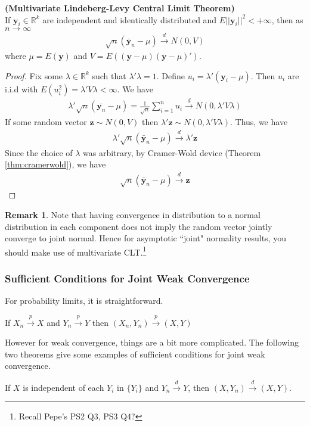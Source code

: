 \documentclass[11pt]{article} %
\theoremstyle{definition}
\numberwithin{defn}{subsection}
\numberwithin{thm}{subsection}
\newtheorem*{rmk}{Remark}
\numberwithin{ex}{subsection}
\newcommand{\bb}[1]{\mathbb{#1}}
\newcommand{\R}{\bb{R}}
\newcommand{\plim}{\overset{p}{\rightarrow}}
\newcommand{\dlim}{\overset{d}{\rightarrow}}
\newcommand{\sumi}{\sum_{i=1}^n}
\newcommand{\ninfty}{n\rightarrow\infty}
\begin{document}

\begin{thm}\label{thm:clt(vector)}
	\textbf{(Multivariate Lindeberg-Levy Central Limit Theorem)}	\\
	If $\bm{y}_i\in\R^k$ are independent and identically distributed and $E||\bm{y}_i||^2<+\infty$, then as $\ninfty$
	\begin{align*}
	\sqrt{n}(\bar{\bm{y}}_n-\mu)\dlim N(0,V)
	\end{align*}
	where $\mu=E(\bm{y})$ and $V=E((\bm{y}-\mu)(\bm{y}-\mu)')$.
	\begin{proof}
		Fix some $\lambda\in \R^k$ such that $\lambda'\lambda=1$. Define $u_i=\lambda'(\bm{y}_i-\mu)$. Then $u_i$ are i.i.d with $E(u_i^2)=\lambda'V\lambda<\infty$. We have
		\begin{align*}
		\lambda'\sqrt{n}(\bar{\bm{y}_n}-\mu)=\frac{1}{\sqrt{n}}\sumi u_i\dlim N(0,\lambda'V\lambda)
		\end{align*}
		If some random vector $\bm{z}\sim N(0,V)$ then $\lambda' \bm{z}\sim N(0,\lambda'V\lambda)$. Thus, we have
		\begin{align*}
		\lambda'\sqrt{n}(\bar{\bm{y}}_n-\mu)\dlim \lambda' \bm{z}
		\end{align*}
		Since the choice of $\lambda$ was arbitrary, by Cramer-Wold device (Theorem \ref{thm:cramerwold}), we have
		\begin{align*}
		\sqrt{n}(\bar{\bm{y}}_n-\mu)\dlim\bm{z}
		\end{align*}
	\end{proof}
\end{thm}
\begin{rmk}
	Note that having convergence in distribution to a normal distribution in each component does not imply the random vector jointly converge to joint normal. Hence for asymptotic ``joint" normality results, you should make use of multivariate CLT.\footnote{Recall Pepe's PS2 Q3, PS3 Q4?}
\end{rmk}

\subsubsection{Sufficient Conditions for Joint Weak Convergence}
For probability limits, it is straightforward.
\begin{thm}
	If $X_n\plim X$ and $Y_n\plim Y$ then $(X_n,Y_n)\plim (X,Y)$	
\end{thm}
However for weak convergence, things are a bit more complicated. The following two theorems give some examples of sufficient conditions for joint weak convergence.
\begin{thm}
	If $X$ is independent of each $Y_i$ in $\{Y_i\}$ and $Y_n\dlim Y$, then $(X,Y_n)\dlim (X,Y)$.
\end{thm}
\end{document}
